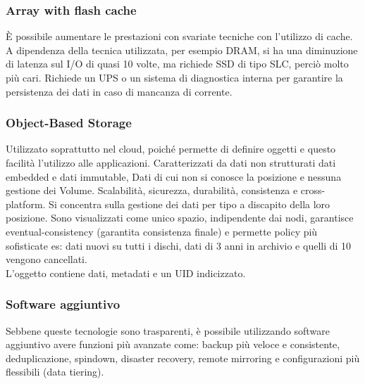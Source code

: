 \documentclass[8pt,a4paper]{extarticle}
\begin{document}
\begin{multicols*}{4}
\subsubsection{Array with flash cache}
È possibile aumentare le prestazioni con svariate tecniche con l'utilizzo di cache. A dipendenza della tecnica utilizzata, per esempio DRAM, si ha una diminuzione di latenza sul I/O di quasi 10 volte, ma richiede SSD di tipo SLC, perciò molto più cari. Richiede un UPS o un sistema di diagnostica interna per garantire la persistenza dei dati in caso di mancanza di corrente.

\subsubsection{Object-Based Storage}
Utilizzato soprattutto nel cloud, poiché permette di definire oggetti e questo facilità l’utilizzo alle applicazioni. Caratterizzati da dati non strutturati dati embedded e dati immutable, Dati di cui non si conosce la posizione e nessuna gestione dei Volume. Scalabilità, sicurezza, durabilità, consistenza e cross-platform. Si concentra sulla gestione dei dati per tipo a discapito della loro posizione. Sono visualizzati come unico spazio, indipendente dai nodi, garantisce eventual-consistency (garantita consistenza finale) e permette policy più sofisticate es: dati nuovi su tutti i dischi, dati di 3 anni in archivio e quelli di 10 vengono cancellati. \\
L'oggetto contiene dati, metadati e un UID indicizzato.

\subsubsection{Software aggiuntivo}
Sebbene queste tecnologie sono trasparenti, è possibile utilizzando software aggiuntivo avere funzioni più avanzate come: backup più veloce e consistente, deduplicazione, spindown, disaster recovery, remote mirroring e configurazioni più flessibili (data tiering).
\end{multicols*}
\end{document}
